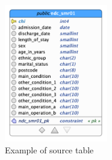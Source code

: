 







\begin{figure}
    \centering
    \includegraphics[width=45mm]{images/DataVault/smr01_source.png}
    \caption{Example of source table}
    \label{fig:smr01_source}
\end{figure}

